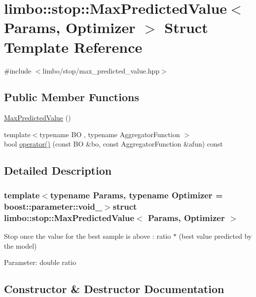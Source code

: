 \hypertarget{structlimbo_1_1stop_1_1_max_predicted_value}{}\section{limbo\+:\+:stop\+:\+:Max\+Predicted\+Value$<$ Params, Optimizer $>$ Struct Template Reference}
\label{structlimbo_1_1stop_1_1_max_predicted_value}


{\ttfamily \#include $<$limbo/stop/max\+\_\+predicted\+\_\+value.\+hpp$>$}

\subsection*{Public Member Functions}
\begin{DoxyCompactItemize}
\item 
\hyperlink{structlimbo_1_1stop_1_1_max_predicted_value_a211e3d4d8935c84ddb27e09d76a1726a}{Max\+Predicted\+Value} ()
\item 
{\footnotesize template$<$typename B\+O , typename Aggregator\+Function $>$ }\\bool \hyperlink{structlimbo_1_1stop_1_1_max_predicted_value_a7f5cb07d4a9b666e4c1cac91afa3fca0}{operator()} (const B\+O \&bo, const Aggregator\+Function \&afun) const 
\end{DoxyCompactItemize}


\subsection{Detailed Description}
\subsubsection*{template$<$typename Params, typename Optimizer = boost\+::parameter\+::void\+\_\+$>$struct limbo\+::stop\+::\+Max\+Predicted\+Value$<$ Params, Optimizer $>$}

Stop once the value for the best sample is above \+: ratio $\ast$ (best value predicted by the model)

Parameter\+: double ratio 

\subsection{Constructor \& Destructor Documentation}
\hypertarget{structlimbo_1_1stop_1_1_max_predicted_value_a211e3d4d8935c84ddb27e09d76a1726a}{}
